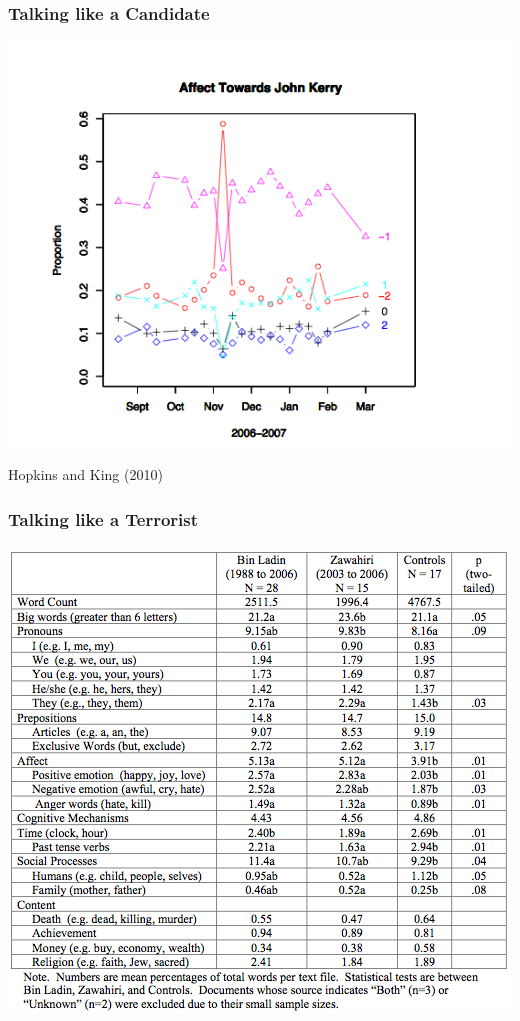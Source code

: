 \documentclass[11pt,compress,professionalfonts]{beamer}
\begin{document}
\begin{frame}[t]\frametitle{Talking like a Candidate}

\centerline{\includegraphics[scale=.7]{pictures/kerry-blogs}}
Hopkins and King (2010)

\end{frame}
\begin{frame}[t]\frametitle{Talking like a Terrorist}

\begin{center}
\includegraphics[scale=.7]{pictures/binladen}
\end{center}

\end{frame}
\end{document}

